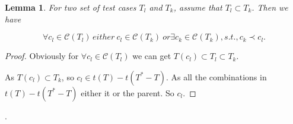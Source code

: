 \documentclass{sig-alternate}
\begin{document}
\newtheorem{lemma}{Lemma}
\begin{lemma}
For two set of test cases $T_{l}$ and $T_{k}$, assume that $T_{l} \subset T_{k}$. Then we have

 \begin{displaymath} \forall c_{l} \in \mathcal{C}(T_{l})\,  either\ c_{l} \in \mathcal{C}(T_{k})\ or \exists c_{k} \in \mathcal{C}(T_{k}), s.t., c_{k} \prec c_{l}.
 \end{displaymath}
%
%

%
%

\end{lemma}

\begin{proof}

Obviously for $\forall c_{l} \in \mathcal{C}(T_{l}) $ we can get $T(c_{l}) \subset T_{l} \subset T_{k}$. 

As $T(c_{l}) \subset T_{k}$, so $c_{l} \in  t(T) - t(T^{*} - T)$. As all the combinations in $t(T) - t(T^{*} - T)$ either it or the parent. So $c_{l}$.

%

\end{proof}.
\end{document}
